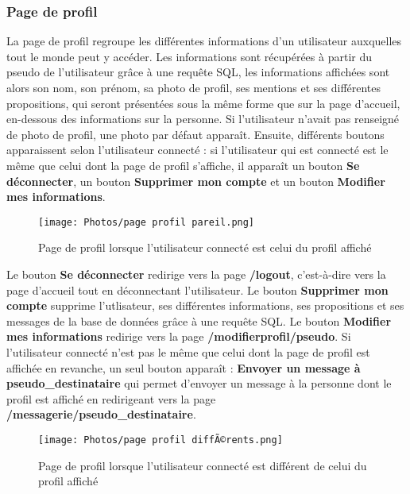 \documentclass{article}
\begin{document}
\subsubsection{Page de profil}
La page de profil regroupe les différentes informations d'un utilisateur auxquelles tout le monde peut y accéder. Les informations sont récupérées à partir du pseudo de l'utilisateur grâce à une requête SQL, les informations affichées sont alors son nom, son prénom, sa photo de profil, ses mentions et ses différentes propositions, qui seront présentées sous la même forme que sur la page d'accueil, en-dessous des informations sur la personne. Si l'utilisateur n'avait pas renseigné de photo de profil, une photo par défaut apparaît. Ensuite, différents boutons apparaissent selon l'utilisateur connecté : si l'utilisateur qui est connecté est le même que celui dont la page de profil s'affiche, il apparaît un bouton \textbf{Se déconnecter}, un bouton \textbf{Supprimer mon compte} et un bouton \textbf{Modifier mes informations}.
\begin{figure}[h!]
    \centering
    \texttt{[image: Photos/page profil pareil.png]}
    \caption{Page de profil lorsque l'utilisateur connecté est celui du profil affiché}
    \label{fig:my_label}
\end{figure} 
\newline
Le bouton \textbf{Se déconnecter} redirige vers la page \textbf{/logout}, c'est-à-dire vers la page d'accueil tout en déconnectant l'utilisateur. Le bouton \textbf{Supprimer mon compte} supprime l'utlisateur, ses différentes informations, ses propositions et ses messages de la base de données grâce à une requête SQL. Le bouton \textbf{Modifier mes informations} redirige vers la page \textbf{/modifierprofil/pseudo}. 
Si l'utilisateur connecté n'est pas le même que celui dont la page de profil est affichée en revanche, un seul bouton apparaît : \textbf{Envoyer un message à pseudo\_destinataire } qui permet d'envoyer un message à la personne dont le profil est affiché en redirigeant vers la page \textbf{/messagerie/pseudo\_destinataire}.
\begin{figure}[h!]
    \centering
    \texttt{[image: Photos/page profil diffÃ©rents.png]}
    \caption{Page de profil lorsque l'utilisateur connecté est différent de celui du profil affiché}
    \label{fig:my_label}
\end{figure} 
\vspace{4cm}
\end{document}
